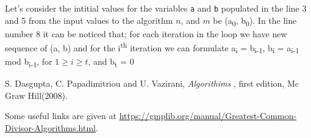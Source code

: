 \documentclass[12pt]{article}
\begin{document}
Let's consider the intitial values for the variables \texttt{a} and \texttt{b} populated in the line 3 and 5 from the input values to the algorithm $n$, and $m$ be (a\textsubscript{0}, b\textsubscript{0}). In the line number 8 it can be noticed that; for each iteration in the loop we have new sequence of (a, b) and for the i\textsuperscript{th} iteration we can formulate a\textsubscript{i} = b\textsubscript{i-1}, b\textsubscript{i} = a\textsubscript{i-1} mod b\textsubscript{i-1}, for $1 \geq i \geq t$, and b\textsubscript{t} = 0


\begin{thebibliography}{6}

S. Dasgupta, C. Papadimitriou and U. Vazirani, \textsl{Algorithims
},
first edition, Mc Graw Hill(2008).

Some useful links are given at \url{https://gmplib.org/manual/Greatest-Common-Divisor-Algorithms.html}.

\end{thebibliography}
\end{document}
